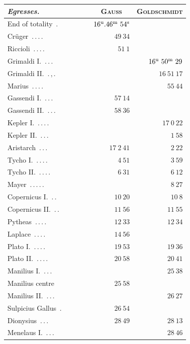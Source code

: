 \clearpage
\begin{center}\begingroup\fontsize{10}{12}\selectfont\setlength{\tabcolsep}{5pt}
\begin{tabular}{@{}p{0.47\linewidth}|r|r@{}}
\emph{Egresses.} & \multicolumn{1}{c|}{\textsc{Gauss}} & \multicolumn{1}{c}{\textsc{Goldschmidt}}\\\hline
End of totality\ \mbox{.} & $16^{\rm u}.46^{\rm m}\ 54^{\rm s}$ & \\
Crüger\ \mbox{.\,.\,.\,.} & $49\ 34$ & \\
Riccioli\ \mbox{.\,.\,.\,.} & $51\ 1$ & \\
Grimaldi I.\ \mbox{.\,.\,.} &  & $16^{\rm u}\ 50^{\rm m}\ 29$\\
Grimaldi II.\ \mbox{.\,,\,.} &  & $16\ 51\ 17$\\
Marius\ \mbox{.\,.\,.\,.} &  & $55\ 44$\\
Gassendi I.\ \mbox{.\,.\,.} & $57\ 14$ & \\
Gassendi II.\ \mbox{.\,.\,.} & $58\ 36$ & \\
Kepler I.\ \mbox{.\,.\,.\,.} &  & $17\ 0\ 22$\\
Kepler II.\ \mbox{.\,.\,.} &  & $1\ 58$\\
Aristarch\ \mbox{.\,.\,.} & $17\ 2\ 41$ & $2\ 22$\\
Tycho I.\ \mbox{.\,.\,.\,.} & $4\ 51$ & $3\ 59$\\
Tycho II.\ \mbox{.\,.\,.\,.} & $6\ 31$ & $6\ 12$\\
Mayer\ \mbox{.\,.\,.\,.\,.} &  & $8\ 27$\\
Copernicus I.\ \mbox{.\,.} & $10\ 20$ & $10\ 8$\\
Copernicus II.\ \mbox{.\,.} & $11\ 56$ & $11\ 55$\\
Pytheas\ \mbox{.\,.\,.\,.} & $12\ 33$ & $12\ 34$\\
Laplace\ \mbox{.\,.\,.\,.} & $14\ 56$ & \\
Plato I.\ \mbox{.\,.\,.\,.} & $19\ 53$ & $19\ 36$\\
Plato II.\ \mbox{.\,.\,.\,.} & $20\ 58$ & $20\ 41$\\
Manilius I.\ \mbox{.\,.\,.} &  & $25\ 38$\\
Manilius centre & $25\ 58$ & \\
Manilius II.\ \mbox{.\,.\,.} &  & $26\ 27$\\
Sulpicius Gallus\ \mbox{.} & $26\ 54$ & \\
Dionysius\ \mbox{.\,.\,.} & $28\ 49$ & $28\ 13$\\
Menelaus I.\ \mbox{.\,.\,.} &  & $28\ 46$\\

\end{tabular}
\end{center}
